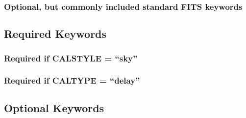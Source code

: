 \documentclass[11pt, oneside, english]{article}   	%
\begin{document}
	\subsubsection{Optional, but commonly included standard FITS keywords}
\subsection{Required Keywords}
	\subsubsection{Required if CALSTYLE = ``sky''}
	\subsubsection{Required if CALTYPE = ``delay''}
\subsection{Optional Keywords}
\end{document}
